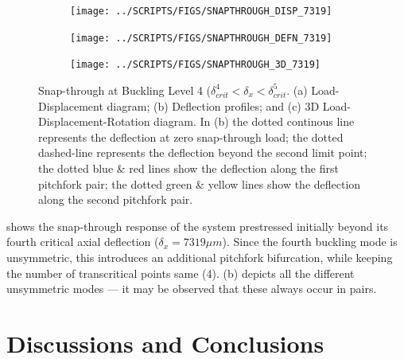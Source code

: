 \documentclass[10pt]{article}
\begin{document}
\begin{figure}[!h]
  \centering
  \begin{subfigure}[!t]{0.33\linewidth}
    \centering    
    \texttt{[image: ../SCRIPTS/FIGS/SNAPTHROUGH\_DISP\_7319]}
    \caption{}
  \end{subfigure}%
  \begin{subfigure}[!t]{0.33\linewidth}
    \centering    
    \texttt{[image: ../SCRIPTS/FIGS/SNAPTHROUGH\_DEFN\_7319]}
    \caption{}
  \end{subfigure}%
  \begin{subfigure}[!t]{0.33\linewidth}
    \centering
    \texttt{[image: ../SCRIPTS/FIGS/SNAPTHROUGH\_3D\_7319]}
    \caption{}
  \end{subfigure}
  \caption{Snap-through at Buckling Level 4 ($\delta_{crit}^4 <
    \delta_x < \delta_{crit}^5$. (a) Load-Displacement diagram; (b)
    Deflection profiles; and (c) 3D Load-Displacement-Rotation
    diagram. In (b) the dotted continous line represents
    the deflection at zero snap-through load; the dotted dashed-line
    represents the deflection beyond the second limit point; the
    dotted blue \& red lines show the deflection along the first
    pitchfork pair; the dotted green \& yellow lines show the
    deflection along the second pitchfork pair.}
  \label{fig:buck4}
\end{figure}

 shows the snap-through response of the system
prestressed initially beyond its fourth critical axial deflection
($\delta_x=7319\mu m$). Since the fourth buckling mode is unsymmetric,
this introduces an additional pitchfork bifurcation, while keeping the
number of transcritical points same (4). (b) depicts
all the different unsymmetric modes --- it may be observed that these
always occur in pairs.

\section{Discussions and Conclusions}
\label{sec:disc-concl}
\end{document}
